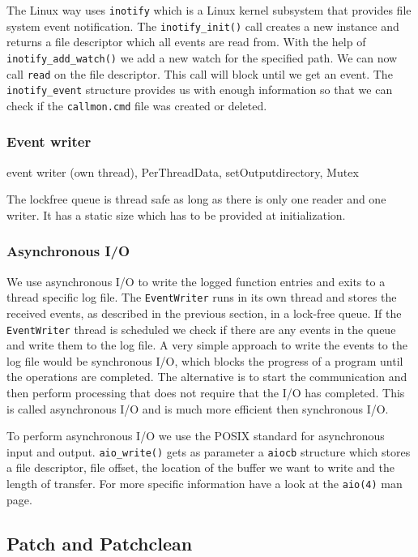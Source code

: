 The Linux way uses \verb=inotify= which is a Linux kernel subsystem that provides file system event notification. The \verb=inotify_init()= call creates a new instance and returns a file descriptor which all events are read from. With the help of \verb=inotify_add_watch()= we add a new watch for the specified path. We can now call \verb=read= on the file descriptor. This call will block until we get an event. The \verb=inotify_event= structure provides us with enough information so that we can check if the \verb=callmon.cmd= file was created or deleted.

\subsubsection{Event writer} 

event writer (own thread), PerThreadData, setOutputdirectory, Mutex

The lockfree queue is thread safe as long as there is only one reader and one writer. It has a static size which has to be provided at initialization. 

\subsubsection{Asynchronous I/O}

We use asynchronous I/O to write the logged function entries and exits to a thread specific log file. The \verb=EventWriter= runs in its own thread and stores the received events, as described in the previous section, in a lock-free queue. If the \verb=EventWriter= thread is scheduled we check if there are any events in the queue and write them to the log file. A very simple approach to write the events to the log file would be synchronous I/O, which blocks the progress of a program until the operations are completed. The alternative is to start the communication and then perform processing that does not require that the I/O has completed. This is called asynchronous I/O and is much more efficient then synchronous I/O.

To perform asynchronous I/O we use the POSIX standard for asynchronous input and output. \verb=aio_write()= gets as parameter a \verb=aiocb= structure which stores a file descriptor, file offset, the location of the buffer we want to write and the length of transfer. For more specific information have a look at the \verb=aio(4)= man page.


\subsection{Patch and Patchclean}

